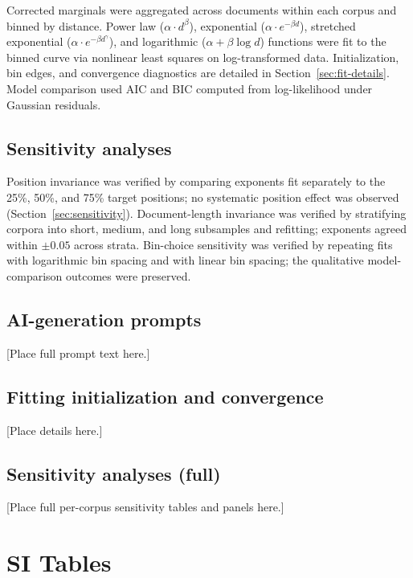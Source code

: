 \documentclass[9pt,twoside,lineno]{pnas-new}
\begin{document}
Corrected marginals were aggregated across documents within each corpus and binned by distance. Power law ($\alpha \cdot d^{\beta}$), exponential ($\alpha \cdot e^{-\beta d}$), stretched exponential ($\alpha \cdot e^{-\beta d^{\gamma}}$), and logarithmic ($\alpha + \beta \log d$) functions were fit to the binned curve via nonlinear least squares on log-transformed data. Initialization, bin edges, and convergence diagnostics are detailed in Section~\ref{sec:fit-details}. Model comparison used AIC and BIC computed from log-likelihood under Gaussian residuals.

\subsection*{Sensitivity analyses}
Position invariance was verified by comparing exponents fit separately to the 25\%, 50\%, and 75\% target positions; no systematic position effect was observed (Section~\ref{sec:sensitivity}). Document-length invariance was verified by stratifying corpora into short, medium, and long subsamples and refitting; exponents agreed within $\pm 0.05$ across strata. Bin-choice sensitivity was verified by repeating fits with logarithmic bin spacing and with linear bin spacing; the qualitative model-comparison outcomes were preserved.

\subsection*{AI-generation prompts}
\label{sec:ai-prompts}
[Place full prompt text here.]

\subsection*{Fitting initialization and convergence}
\label{sec:fit-details}
[Place details here.]

\subsection*{Sensitivity analyses (full)}
\label{sec:sensitivity}
[Place full per-corpus sensitivity tables and panels here.]


\section*{SI Tables}
\end{document}
